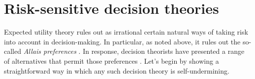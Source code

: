 \documentclass[a4paper]{article}
\newenvironment{CCM rewritten}
{\begingroup\color{blue}} %
{\endgroup}              %
\begin{document}



\section{Risk-sensitive decision theories}\label{sect:reu}

Expected utility theory rules out as irrational certain natural ways of taking risk into account in decision-making. In particular, as noted above, it rules out the so-called \emph{Allais preferences} \citep{allais1953c}. In response, decision theorists have presented a range of alternatives that permit those preferences \citep{kahneman1979pt,machina1982eua,quiggin1982tau, buchak2014rr}. Let's begin by showing a straightforward way in which any such decision theory is self-undermining.
\end{document}
